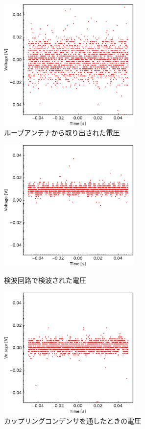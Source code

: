 \documentclass[report.tex]{subfiles}
\begin{document}
\begin{figure}[H]
	\centering
	\includegraphics[width=7cm]{fig/koil.pdf}
	\caption{ループアンテナから取り出された電圧}
	\label{fig:koil}
\end{figure}

\begin{figure}[H]
	\begin{minipage}[b]{0.5\linewidth}
		\centering
		\includegraphics[width=7cm]{fig/koil_diode.pdf}
		\caption{検波回路で検波された電圧}
		\label{fig:koil_diode}
	\end{minipage}
	\begin{minipage}[b]{0.5\linewidth}
		\centering
		\includegraphics[width=7cm]{fig/koil_diode_bi.pdf}
		\caption{カップリングコンデンサを通したときの電圧}
		\label{fig:koil_diode_bi}
	\end{minipage}
\end{figure}
\end{document}
